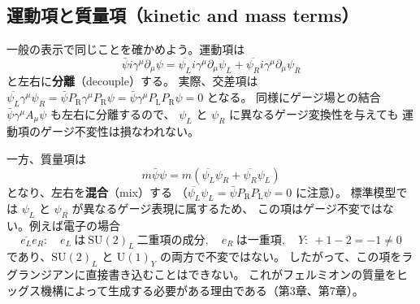 \documentclass[uplatex,dvipdfmx,a4paper,11pt,openany]{jsbook}
\newcommand{\en}[1]{（#1）}
\numberwithin{equation}{chapter}
\theoremstyle{definition}
\theoremstyle{plain}
\theoremstyle{remark}
\newcommand{\SU}{\mathrm{SU}}
\newcommand{\U}{\mathrm{U}}
\newcommand{\PL}{P_{\mathrm{L}}}
\newcommand{\PR}{P_{\mathrm{R}}}
\begin{document}
\subsection{運動項と質量項（kinetic and mass terms）}
一般の表示で同じことを確かめよう。運動項は
\begin{equation}
\bar\psi i\gamma^\mu\partial_\mu\psi
=
\overline{\psi_L}i\gamma^\mu\partial_\mu\psi_L
+
\overline{\psi_R}i\gamma^\mu\partial_\mu\psi_R
\end{equation}
と左右に\textbf{分離}\en{decouple}する。
実際、交差項は
$\overline{\psi_L}\gamma^\mu\psi_R=\bar\psi\PR\gamma^\mu\PR\psi=\bar\psi\gamma^\mu\PL\PR\psi=0$
となる。
同様にゲージ場との結合 $\bar\psi\gamma^\mu A_\mu\psi$ も左右に分離するので、
$\psi_L$ と $\psi_R$ に異なるゲージ変換性を与えても
運動項のゲージ不変性は損なわれない。

一方、質量項は
\begin{equation}
m\bar\psi\psi
=
m\left(\overline{\psi_L}\psi_R+\overline{\psi_R}\psi_L\right)
\end{equation}
となり、左右を\textbf{混合}\en{mix}する
（$\overline{\psi_L}\psi_L=\bar\psi\PR\PL\psi=0$ に注意）。
標準模型では $\psi_L$ と $\psi_R$ が異なるゲージ表現に属するため、
この項はゲージ不変ではない。例えば電子の場合
\begin{equation}
\overline{e_L}e_R:\quad
e_L\ \text{は}\ \SU(2)_L\ \text{二重項の成分},\quad
e_R\ \text{は一重項},\quad
Y:\ +1-2=-1\neq0
\end{equation}
であり、$\SU(2)_L$ と $\U(1)_Y$ の両方で不変ではない。
したがって、この項をラグランジアンに直接書き込むことはできない。
これがフェルミオンの質量をヒッグス機構によって生成する必要がある理由である（第3章、第7章）。
\end{document}
